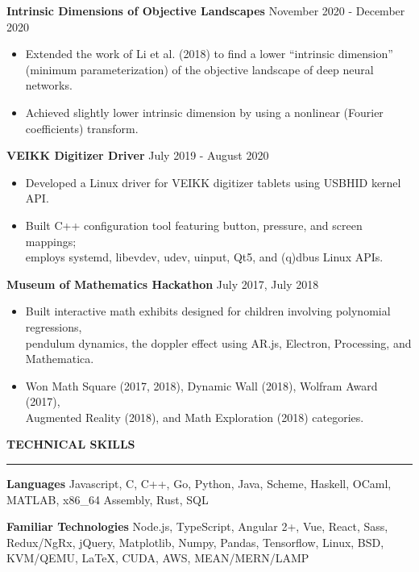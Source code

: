 \documentclass[]{article}
\newcommand{\br}{\vspace{10pt}}
\newcommand{\brs}{\vspace{3pt}}
\newcommand{\hr}{\vspace{4pt}\hrule\vspace{4pt}}
\begin{document}
\brs

\textbf{Intrinsic Dimensions of Objective Landscapes}
\hfill
November 2020 - December 2020
\begin{itemize}
\item Extended the work of Li et al. (2018) to find a lower ``intrinsic
  dimension'' \\ (minimum parameterization) of the objective landscape of deep
  neural networks.
\item Achieved slightly lower intrinsic dimension by using a nonlinear (Fourier
  coefficients) transform.
\end{itemize}

\brs

\textbf{VEIKK Digitizer Driver}
\hfill
July 2019 - August 2020
\begin{itemize}
\item Developed a Linux driver for VEIKK digitizer tablets using USBHID kernel
  API.
\item Built C++ configuration tool featuring button, pressure, and screen
  mappings; \\
  employs systemd, libevdev, udev, uinput, Qt5, and (q)dbus Linux APIs.
\end{itemize}

\brs

\textbf{Museum of Mathematics Hackathon}
\hfill
July 2017, July 2018
\begin{itemize}
\item Built interactive math exhibits designed for children involving polynomial
  regressions, \\ pendulum dynamics, the doppler effect
  using AR.js, Electron, Processing, and Mathematica.
\item Won Math Square (2017, 2018), Dynamic Wall (2018), Wolfram Award (2017),
  \\ Augmented Reality (2018), and Math Exploration (2018) categories.
\end{itemize}

\br

\textbf{TECHNICAL SKILLS}
\hr

\textbf{Languages} Javascript, C, C++, Go, Python, Java, Scheme, Haskell, OCaml,
MATLAB, x86\_64 Assembly, Rust, SQL

\brs

\textbf{Familiar Technologies} Node.js, TypeScript, Angular 2+, Vue, React,
Sass, Redux/NgRx, jQuery, Matplotlib, Numpy, Pandas, Tensorflow, Linux, BSD,
KVM/QEMU, \LaTeX, CUDA, AWS, MEAN/MERN/LAMP
\end{document}
